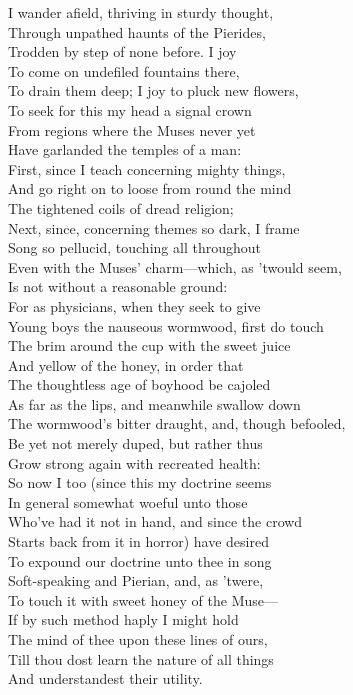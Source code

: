 I wander afield, thriving in sturdy thought,\\
Through unpathed haunts of the Pierides,\\
Trodden by step of none before. I joy\\
To come on undefiled fountains there,\\
To drain them deep; I joy to pluck new flowers,\\
To seek for this my head a signal crown\\
From regions where the Muses never yet\\
Have garlanded the temples of a man:\\
First, since I teach concerning mighty things,\\
And go right on to loose from round the mind\\
The tightened coils of dread religion;\\
Next, since, concerning themes so dark, I frame\\
Song so pellucid, touching all throughout\\
Even with the Muses' charm—which, as 'twould seem,\\
Is not without a reasonable ground:\\
For as physicians, when they seek to give\\
Young boys the nauseous wormwood, first do touch\\
The brim around the cup with the sweet juice\\
And yellow of the honey, in order that\\
The thoughtless age of boyhood be cajoled\\
As far as the lips, and meanwhile swallow down\\
The wormwood's bitter draught, and, though befooled,\\
Be yet not merely duped, but rather thus\\
Grow strong again with recreated health:\\
So now I too (since this my doctrine seems\\
In general somewhat woeful unto those\\
Who've had it not in hand, and since the crowd\\
Starts back from it in horror) have desired\\
To expound our doctrine unto thee in song\\
Soft-speaking and Pierian, and, as 'twere,\\
To touch it with sweet honey of the Muse—\\
If by such method haply I might hold\\
The mind of thee upon these lines of ours,\\
Till thou dost learn the nature of all things\\
And understandest their utility.

